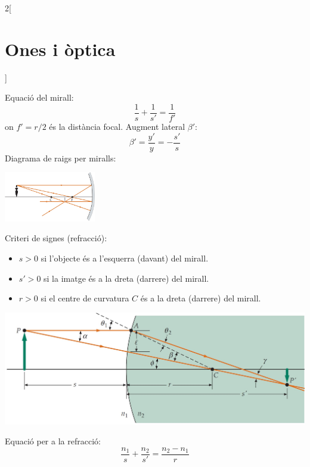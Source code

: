 \documentclass[../../../main.tex]{subfiles}
\begin{document}
\begin{multicols}{2}[\section{Ones i òptica}]
\begin{minipage}{\linewidth}
  \end{minipage}
  Equació del mirall:
  $$\frac{1}{s}+\frac{1}{s'}=\frac{1}{f'}$$ {\footnotesize on $f'=r/2$ és la distància focal.}\newline
  Augment lateral $\beta'$:
  $$\beta'=\frac{y'}{y}=-\frac{s'}{s}$$
  Diagrama de raigs per miralls:\newline
  \begin{minipage}{\linewidth}
    \centering
    \includegraphics[width=4cm]{Physics/1st/Waves_and_optics/Images/raigs.jpg}
  \end{minipage}
  Criteri de signes (refracció):
  \begin{itemize}
    \item $s>0$ si l'objecte és a l'esquerra (davant) del mirall.
    \item $s'>0$ si la imatge és a la dreta (darrere) del mirall.
    \item $r>0$ si el centre de curvatura $C$ és a la dreta (darrere) del mirall.
  \end{itemize}
  \begin{minipage}{\linewidth}
    \centering
    \includegraphics[width=\linewidth]{Physics/1st/Waves_and_optics/Images/ref.jpg}
  \end{minipage}
  Equació per a la refracció:
  $$\frac{n_1}{s}+\frac{n_2}{s'}=\frac{n_2-n_1}{r}$$

\end{multicols}
\end{document}
